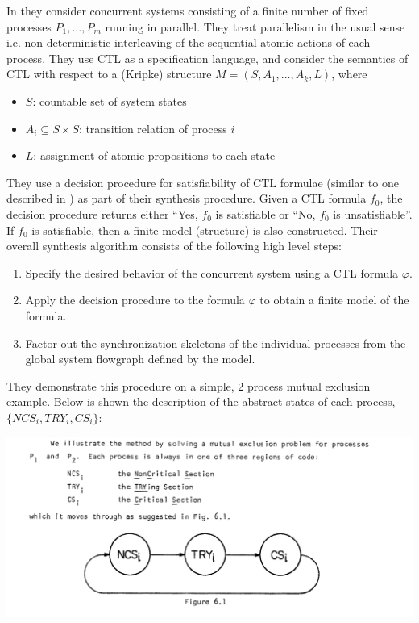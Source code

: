 \documentclass[10pt,a4paper]{article}
\begin{document}
In \cite{1981clarkemerson} they consider concurrent systems consisting of a finite number of fixed processes $P_1,\dots,P_m$ running in parallel. They treat parallelism in the usual sense i.e. non-deterministic interleaving of the sequential atomic actions of each process. They use CTL as a specification language, and consider the semantics of CTL with respect to a (Kripke) structure $M=(S,A_1,\dots,A_k,L)$, where
\begin{itemize}
    \item $S$: countable set of system states
    \item $A_i \subseteq S \times S$: transition relation of process $i$
    \item $L$: assignment of atomic propositions to each state
\end{itemize}
They use a decision procedure for satisfiability of CTL formulae (similar to one described in \cite{1981benari}) as part of their synthesis procedure. Given a CTL formula $f_0$, the decision procedure returns either ``Yes, $f_0$ is satisfiable or ``No, $f_0$ is unsatisfiable''. If $f_0$ is satisfiable, then a finite model (structure) is also constructed. Their overall synthesis algorithm consists of the following high level steps:
\begin{enumerate}
    \item Specify the desired behavior of the concurrent system using a CTL formula $\varphi$.
    \item Apply the decision procedure to the formula $\varphi$ to obtain a finite model of the formula.
    \item Factor out the synchronization skeletons of the individual processes from the global system flowgraph defined by the model.
\end{enumerate}
They demonstrate this procedure on a simple, 2 process mutual exclusion example. Below is shown the description of the abstract states of each process, $\{NCS_i, TRY_i, CS_i\}$: 
\begin{center}
    \includegraphics[scale=0.4]{images/mutex_processes.png}
\end{center}
\end{document}
